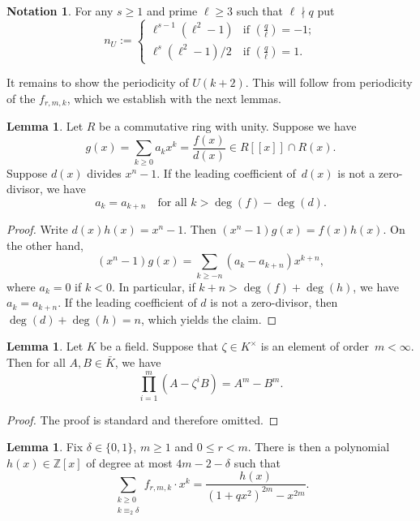 \documentclass[10pt]{article}
\theoremstyle{definition}
\newtheorem{lemma}[theorem]{Lemma}
\newtheorem{notation}[theorem]{Notation}
\renewcommand{\:}{\colon}
\begin{document}
\begin{notation} For any $s \geq 1$ and prime $\ell \geq 3$ such that $\ell \nmid q$ put 
    \[
    n_{U} := \begin{cases}
\ell^{s-1}(\ell^2-1) & \text{if } \left( \frac{q}{\ell} \right) = -1; \\
    \ell^{s}(\ell^2-1)/2 & \text{if } \left( \frac{q}{\ell} \right) = 1.        
    \end{cases}
    \]    
\end{notation}


It remains to show the periodicity of $U(k+2)$. This will follow 
from periodicity of the $f_{r,m,k}$, which we establish with the next lemmas.

\begin{lemma}\label{lem:periodic_criterion}
Let $R$ be a commutative ring with unity. Suppose we have 
\[
g(x) = \sum_{k \geq 0} a_k x^k = \frac{f(x)}{d(x)} \in R[\![x]\!] \cap R(x).
\]
Suppose $d(x)$ divides $x^n - 1$. If the leading coefficient of~$d(x)$ is not a zero-divisor, we have
\[
a_k = a_{k+n} \quad \text{for all } k > \deg(f) - \deg(d).
\]
\end{lemma}

\begin{proof}
    Write $d(x)h(x) = x^n-1$. Then $(x^n-1)g(x) = f(x)h(x)$. On the other hand,
    \[
    (x^n-1)g(x) = \sum_{k \geq -n} (a_k - a_{k+n})x^{k+n},
    \]
    where $a_k = 0$ if $k < 0$. In particular, if $k + n > \deg(f) + \deg(h)$, we have $a_{k} = a_{k+n}$. If the leading coefficient of $d$ is not a zero-divisor, then $\deg(d) + \deg(h) = n$, which yields the claim.
\end{proof}

\begin{lemma}\label{lem:rootofunity}
    Let $K$ be a field. Suppose that $\zeta \in K^\times$ is an element of order~$m < \infty$. Then for all $A, B \in \bar{K}$, we have
    \[
    \prod_{i=1}^m (A - \zeta^iB) = A^m - B^m.
    \]
\end{lemma}
\begin{proof}
    The proof is standard and therefore omitted. 
\end{proof}

\begin{lemma}\label{lem:series_rational} 
    Fix $\delta \in \{0,1\}$, $m \geq 1$ and $0 \leq r < m$. There is then a polynomial $h(x) \in \mathbb Z[x]$ of degree at most $4m-2-\delta$ such that
    \[
    \sum_{\substack{k \geq 0 \\ k\equiv_2 \delta}} f_{r,m,k} \cdot x^{k} = \frac{h(x)}{(1+qx^2)^{2m} - x^{2m}}. 
    \]
\end{lemma}
\end{document}
